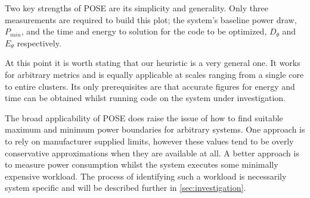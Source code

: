 

\todo{} Two key strengths of POSE are its simplicity and generality.
Only three measurements are required to build this plot; the system's baseline power draw, $P_{min}$, and the time and energy to solution for the code to be optimized, $D_\theta$ and $E_\theta$ respectively.



\todo{} At this point it is worth stating that our heuristic is a very general one.
It works for arbitrary metrics and is equally applicable at scales ranging from a single core to entire clusters.
Its only prerequisites are that accurate figures for energy and time can be obtained whilst running code on the system under investigation.

The broad applicability of POSE does raise the issue of how to find suitable maximum and minimum power boundaries for arbitrary systems. 
One approach is to rely on manufacturer supplied limits, however these values tend to be overly conservative approximations when they are available at all.
A better approach is to measure power consumption whilst the system executes some minimally expensive workload. 
The process of identifying such a workload is necessarily system specific and will be described further in \autoref{sec:investigation}.

